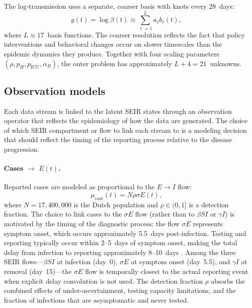 \documentclass[11pt]{article}
\begin{document}
The log-transmission uses a separate, coarser basis with knots every 28~days:
\begin{equation}
  g(t) = \log\beta(t) \approx \sum_{\ell=1}^{L} a_\ell b_\ell(t),
\end{equation}
where $L \approx 17$~basis functions. The coarser resolution reflects the fact that policy interventions and behavioral changes occur on slower timescales than the epidemic dynamics they produce. Together with four scaling parameters $(\rho, p_H, p_{\mathrm{ICU}}, \alpha_R)$, the outer problem has approximately $L+4 = 21$~unknowns.

\subsection{Observation models}\label{sec:obs-models}

Each data stream is linked to the latent SEIR states through an observation operator that reflects the epidemiology of how the data are generated. The choice of which SEIR compartment or flow to link each stream to is a modeling decision that should reflect the timing of the reporting process relative to the disease progression.

\paragraph{Cases $\to$ $E(t)$.}
Reported cases are modeled as proportional to the $E\to I$ flow:
\begin{equation}\label{eq:obs-cases}
  \mu_{\mathrm{case}}(t) = N\rho\sigma E(t),
\end{equation}
where $N=17{,}400{,}000$ is the Dutch population and $\rho\in(0,1]$ is a detection fraction. The choice to link cases to the $\sigma E$ flow (rather than to $\beta SI$ or $\gamma I$) is motivated by the timing of the diagnostic process: the flow $\sigma E$ represents symptom onset, which occurs approximately 5.5~days post-infection. Testing and reporting typically occur within 2--5~days of symptom onset, making the total delay from infection to reporting approximately 8--10~days \citep{Gostic2020}. Among the three SEIR flows---$\beta SI$ at infection (day~0), $\sigma E$ at symptom onset (day~5.5), and $\gamma I$ at removal (day~15)---the $\sigma E$ flow is temporally closest to the actual reporting event when explicit delay convolution is not used. The detection fraction $\rho$ absorbs the combined effects of under-ascertainment, testing capacity limitations, and the fraction of infections that are asymptomatic and never tested.
\end{document}

